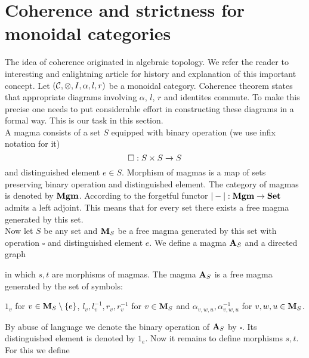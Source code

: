 \section{Coherence and strictness for monoidal categories}
\noindent
The idea of coherence originated in algebraic topology. We refer the reader to interesting and enlightning article \cite{maclane1963natural} for history and explanation of this important concept. Let $({\mathcal C},\otimes, I,\alpha, l, r)$ be a monoidal category. Coherence theorem states that appropriate diagrams involving $\alpha$, $l$, $r$ and identites commute. To make this precise one needs to put considerable effort in constructing these diagrams in a formal way. This is our task in this section.\\
A magma consists of a set $S$ equipped with binary operation (we use infix notation for it)
$$\square:S\times S\rightarrow S$$
and distinguished element $e\in S$. Morphism of magmas is a map of sets preserving binary operation and distinguished element. The category of magmas is denoted by $\mathbf{Mgm}$. According to {\cite[Corollary 3.7.8]{borceux1994handbook}} the forgetful functor $|-|:\mathbf{Mgm}\rightarrow \mathbf{Set}$ admits a left adjoint. This means that for every set there exists a free magma generated by this set.\\
Now let $S$ be any set and $\mathbf{M}_S$ be a free magma generated by this set with operation $\square$ and distinguished element $e$. We define a magma $\mathbf{A}_S$ and a directed graph
\begin{center}
\end{center}
in which $s, t$ are morphisms of magmas. The magma $\mathbf{A}_S$ is a free magma generated by the set of symbols:
\begin{center}
$1_v$ for $v\in \mathbf{M}_S\setminus \{e\}$, $l_v,l^{-1}_v,r_v,r^{-1}_v$ for $v\in \mathbf{M}_S$ and $\alpha_{v,w,u},\alpha^{-1}_{v,w,u}$ for $v,w,u\in \mathbf{M}_S$.
\end{center}
By abuse of language we denote the binary operation of $\mathbf{A}_S$ by $\square$. Its distinguished element is denoted by $1_e$. Now it remains to define morphisms $s,t$. For this we define
